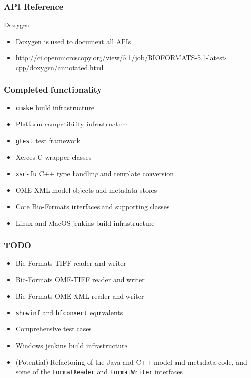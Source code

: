\begin{frame}[fragile]
  \frametitle{API Reference}
\begin{block}{Doxygen}
  \begin{itemize}
  \item Doxygen is used to document all APIs
    \item \url{http://ci.openmicroscopy.org/view/5.1/job/BIOFORMATS-5.1-latest-cpp/doxygen/annotated.html}
  \end{itemize}
\end{block}
\end{frame}

\begin{frame}[fragile]
  \frametitle{Completed functionality}
  \begin{itemize}
  \item \texttt{cmake} build infrastructure
  \item Platform compatibility infrastructure
  \item \texttt{gtest} test framework
  \item Xerces-C wrapper classes
  \item \texttt{xsd-fu} C++ type handling and template conversion
  \item OME-XML model objects and metadata stores
  \item Core Bio-Formats interfaces and supporting classes
  \item Linux and MacOS jenkins build infrastructure
  \end{itemize}
\end{frame}

\begin{frame}[fragile]
  \frametitle{TODO}
  \begin{itemize}
  \item Bio-Formats TIFF reader and writer
  \item Bio-Formats OME-TIFF reader and writer
  \item Bio-Formats OME-XML reader and writer
  \item \texttt{showinf} and \texttt{bfconvert} equivalents
  \item Comprehensive test cases
  \item Windows jenkins build infrastructure
  \item (Potential) Refactoring of the Java and C++ model and metadata code, and
    some of the \texttt{FormatReader} and \texttt{FormatWriter}
    interfaces
  \end{itemize}
\end{frame}
